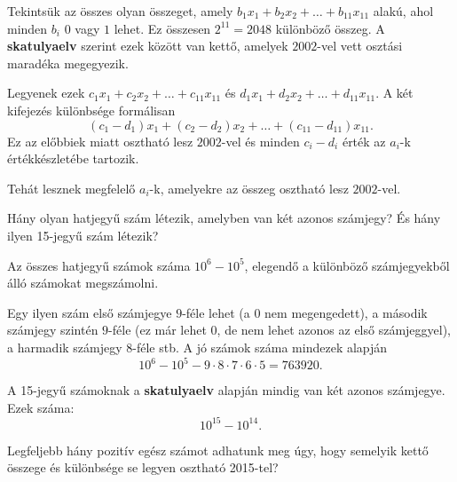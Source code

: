\begin{solution}
	Tekintsük az összes olyan összeget, amely $b_{1}x_{1}+b_{2}x_{2}+\dots+b_{11}x_{11}$
	alakú, ahol minden $b_{i}$ $0$ vagy $1$ lehet. Ez összesen $2^{11}=2048$
	különböző összeg. A \textbf{skatulyaelv} szerint ezek között van kettő,
	amelyek $2002$-vel vett osztási maradéka megegyezik.
	
	Legyenek ezek $c_{1}x_{1}+c_{2}x_{2}+\dots+c_{11}x_{11}$ és $d_{1}x_{1}+d_{2}x_{2}+\dots+d_{11}x_{11}$.
	A két kifejezés különbsége formálisan 
	\[
	(c_{1}-d_{1})x_{1}+(c_{2}-d_{2})x_{2}+\dots+(c_{11}-d_{11})x_{11}.
	\]
	Ez az előbbiek miatt osztható lesz $2002$-vel és minden $c_{i}-d_{i}$
	érték az $a_{i}$-k értékkészletébe tartozik.
	
	Tehát lesznek megfelelő $a_{i}$-k, amelyekre az összeg osztható lesz
	$2002$-vel.
\end{solution}
\begin{extraproblem}
	Hány olyan hatjegyű szám létezik, amelyben van két azonos számjegy?
	És hány ilyen 15-jegyű szám létezik?
\end{extraproblem}

\begin{solution}
	Az összes hatjegyű számok száma $10^{6}-10^{5}$, elegendő a különböző
	számjegyekből álló számokat megszámolni.
	
	Egy ilyen szám első számjegye $9$-féle lehet (a $0$ nem megengedett),
	a második számjegy szintén $9$-féle (ez már lehet $0$, de nem lehet
	azonos az első számjeggyel), a harmadik számjegy $8$-féle stb. A
	jó számok száma mindezek alapján 
	\[
	10^{6}-10^{5}-9\cdot8\cdot7\cdot6\cdot5=763920.
	\]
	
	A 15-jegyű számoknak a \textbf{skatulyaelv} alapján mindig van két
	azonos számjegye. Ezek száma: 
	\[
	10^{15}-10^{14}.
	\]
\end{solution}
\begin{extraproblem}
	Legfeljebb hány pozitív egész számot adhatunk meg úgy, hogy semelyik
	kettő összege és különbsége se legyen osztható 2015-tel? 
\end{extraproblem}

